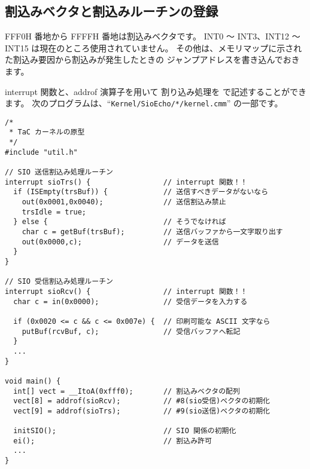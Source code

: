 \subsection{割込みベクタと割込みルーチンの登録}

FFF0H 番地から FFFFH 番地は割込みベクタです。
INT0 〜 INT3、INT12 〜 INT15 は現在のところ使用されていません。
その他は、メモリマップに示された割込み要因から割込みが発生したときの
ジャンプアドレスを書き込んでおきます。

interrupt 関数と、addrof 演算子を用いて
割り込み処理を \cmml で記述することができます。
次のプログラムは、``{\tt Kernel/SioEcho/*/kernel.cmm}'' の一部です。

\begin{mylist}
\begin{verbatim}
/*
 * TaC カーネルの原型
 */
#include "util.h"

// SIO 送信割込み処理ルーチン
interrupt sioTrs() {                 // interrupt 関数！！
  if (ISEmpty(trsBuf)) {             // 送信すべきデータがないなら
    out(0x0001,0x0040);              // 送信割込み禁止
    trsIdle = true;
  } else {                           // そうでなければ
    char c = getBuf(trsBuf);         // 送信バッファから一文字取り出す
    out(0x0000,c);                   // データを送信
  }
}

// SIO 受信割込み処理ルーチン
interrupt sioRcv() {                 // interrupt 関数！！
  char c = in(0x0000);               // 受信データを入力する

  if (0x0020 <= c && c <= 0x007e) {  // 印刷可能な ASCII 文字なら
    putBuf(rcvBuf, c);               // 受信バッファへ転記
  }
  ...
}

void main() {
  int[] vect = __ItoA(0xfff0);       // 割込みベクタの配列
  vect[8] = addrof(sioRcv);          // #8(sio受信)ベクタの初期化
  vect[9] = addrof(sioTrs);          // #9(sio送信)ベクタの初期化

  initSIO();                         // SIO 関係の初期化
  ei();                              // 割込み許可
  ...
}
\end{verbatim}
\end{mylist}
